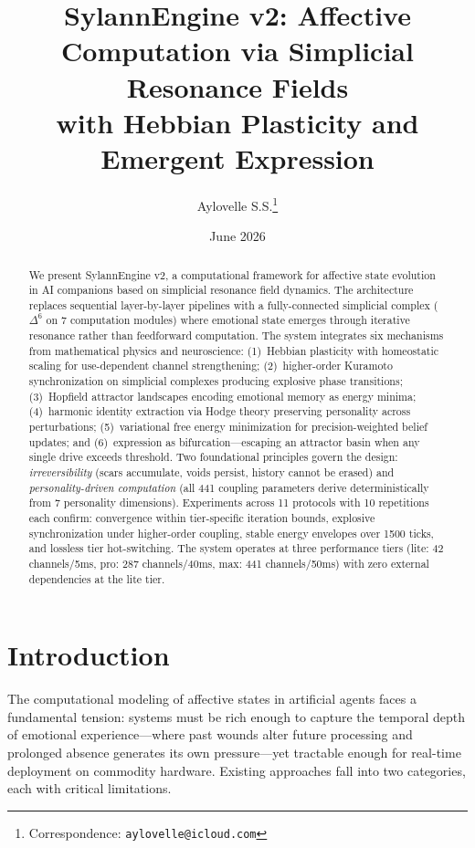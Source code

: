 \documentclass[11pt]{article}
\title{SylannEngine v2: Affective Computation via Simplicial Resonance Fields\\with Hebbian Plasticity and Emergent Expression}
\author{
  Aylovelle S.S.\thanks{Correspondence: \texttt{aylovelle@icloud.com}}
}
\date{June 2026}
\begin{document}
\maketitle

\begin{abstract}
We present SylannEngine v2, a computational framework for affective state evolution in AI companions based on simplicial resonance field dynamics. The architecture replaces sequential layer-by-layer pipelines with a fully-connected simplicial complex ($\Delta^6$ on 7 computation modules) where emotional state emerges through iterative resonance rather than feedforward computation. The system integrates six mechanisms from mathematical physics and neuroscience: (1)~Hebbian plasticity with homeostatic scaling for use-dependent channel strengthening; (2)~higher-order Kuramoto synchronization on simplicial complexes producing explosive phase transitions; (3)~Hopfield attractor landscapes encoding emotional memory as energy minima; (4)~harmonic identity extraction via Hodge theory preserving personality across perturbations; (5)~variational free energy minimization for precision-weighted belief updates; and (6)~expression as bifurcation---escaping an attractor basin when any single drive exceeds threshold. Two foundational principles govern the design: \emph{irreversibility} (scars accumulate, voids persist, history cannot be erased) and \emph{personality-driven computation} (all 441 coupling parameters derive deterministically from 7 personality dimensions). Experiments across 11 protocols with 10 repetitions each confirm: convergence within tier-specific iteration bounds, explosive synchronization under higher-order coupling, stable energy envelopes over 1500 ticks, and lossless tier hot-switching. The system operates at three performance tiers (lite: 42 channels/5ms, pro: 287 channels/40ms, max: 441 channels/50ms) with zero external dependencies at the lite tier.
\end{abstract}

\section{Introduction}
\label{sec:intro}

The computational modeling of affective states in artificial agents faces a fundamental tension: systems must be rich enough to capture the temporal depth of emotional experience---where past wounds alter future processing and prolonged absence generates its own pressure---yet tractable enough for real-time deployment on commodity hardware. Existing approaches fall into two categories, each with critical limitations.
\end{document}
